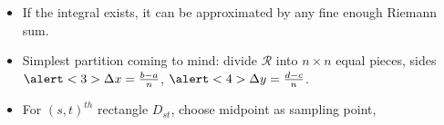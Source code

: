\begin{frame}
\begin{columns}
\begin{itemize}
\item<2-> If the integral exists, it can be approximated by any fine enough Riemann sum.
\item<3-> Simplest partition coming to mind: divide $\mathcal R$ into $n\times n$ equal pieces, sides $\alert<3>{\Delta x = \frac{b-a}{n}}$, $\alert<4>{\Delta y = \frac{d-c}{n}} $.
\item<5-> For $(s,t)^{th}$ rectangle $D_{st}$, choose midpoint as sampling point, 
\end{itemize}
\end{columns}
\end{frame}
